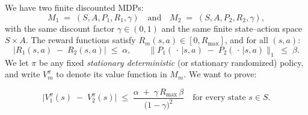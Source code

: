 We have two finite discounted MDPs:
\[
  M_{1} \;=\; (S, A, P_{1}, R_{1}, \gamma)
  \quad\text{and}\quad
  M_{2} \;=\; (S, A, P_{2}, R_{2}, \gamma),
\]
with the same discount factor \(\gamma\in(0,1)\) and the same finite state--action 
space \(S\times A\). The reward functions satisfy \(R_{m}(s,a)\in [0, R_{\max}]\), 
and for all \((s,a)\):
\[
  \bigl| R_{1}(s,a) \;-\; R_{2}(s,a) \bigr| \;\le\; \alpha,
  \qquad
  \bigl\|P_{1}(\,\cdot\,\vert s,a)\;-\;P_{2}(\,\cdot\,\vert s,a)\bigr\|_{1} \;\le\; \beta.
\]
We let \(\pi\) be any fixed \emph{stationary deterministic} (or stationary randomized) 
policy, and write \(V^{\pi}_m\) to denote its value function in \(M_m\). 
We want to prove:

\[
  \bigl|V_{1}^{\pi}(s)\;-\;V_{2}^{\pi}(s)\bigr|
  \;\le\;
  \frac{\alpha \;+\;\gamma \,R_{\max}\,\beta}{\bigl(1-\gamma\bigr)^{2}}
  \quad
  \text{for every state }s \in S.
\]

